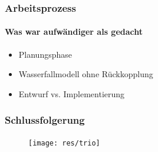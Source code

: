 \documentclass{beamer}
\begin{document}
\begin{frame}
\frametitle{Arbeitsprozess}
\framesubtitle{Was war aufwändiger als gedacht}
\begin{itemize}
	\item<1-3> Planungsphase
	\item<2-3> Wasserfallmodell ohne Rückkopplung
	\item<3> Entwurf vs. Implementierung
\end{itemize}
\end{frame}

\begin{frame}
\frametitle{Schlussfolgerung}
	
\begin{figure}
\texttt{[image: res/trio]}
\end{figure}
\end{frame}

\end{document}
